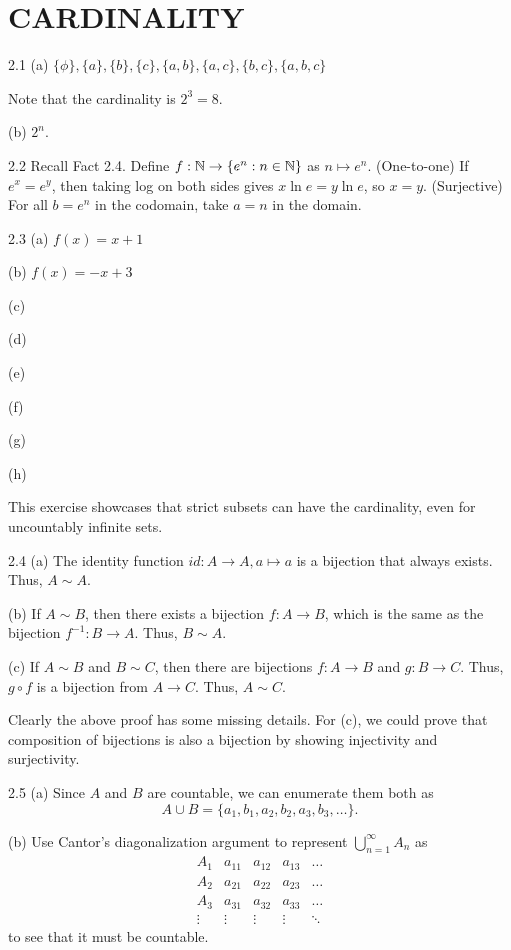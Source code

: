 \section{CARDINALITY}
2.1 (a) $\{\phi\},\{a\},\{b\}, \{c\},\{a,b\},\{a,c\}, \{b,c\}, \{a,b,c\}$
\begin{remark}
    Note that the cardinality is $2^3=8$.
\end{remark}

(b) $2^n$.

2.2 Recall Fact 2.4. Define $f:\mathbb{N} \rightarrow \{e^n: n \in \mathbb{N}\}$ as $n  \mapsto e^n$. (One-to-one) If $e^x=e^y$, then taking log on both sides
gives $x \ln e = y \ln e $, so $x=y$. (Surjective) For all $b = e^n$ in the codomain, take $a = n$ in the domain.   

2.3
(a) $f(x)=x+1$

(b) $f(x)=-x+3$

(c) 

(d)

(e) 

(f)

(g)

(h)
\begin{remark}
    This exercise showcases that strict subsets can have the cardinality, even for uncountably infinite sets.
\end{remark}

2.4 (a) The identity function $id:A \rightarrow A, a \mapsto a$ is a bijection that always exists. Thus, $A \sim A$.

(b) If $A \sim B$, then there exists a bijection $f:A \rightarrow B$, which is the same as the bijection $f^{-1}:B \rightarrow A$. Thus, $B \sim A$.

(c) If $A \sim B$ and $B \sim C$, then there are bijections $f:A \rightarrow B$ and $g:B \rightarrow C$. Thus, $g \circ f$ is a bijection from $A \rightarrow C$. Thus, $A \sim C$.

\begin{remark}
    Clearly the above proof has some missing details. For (c), we could prove that composition of bijections is also a bijection by showing
    injectivity and surjectivity.
\end{remark}

2.5 (a) Since $A$ and $B$ are countable, we can enumerate them both as \[A \cup B =\{a_1, b_1, a_2, b_2, a_3, b_3, \dots \}.\]

(b) Use Cantor's diagonalization argument to represent $\bigcup_{n=1}^{\infty} A_n$ as
\[\begin{matrix}
    A_{1} & a_{11} & a_{12} & a_{13} &\dots \\
    A_{2} & a_{21} & a_{22} & a_{23} &\dots \\
    A_{3} & a_{31} & a_{32} & a_{33} &\dots \\
    \vdots & \vdots & \vdots & \vdots &\ddots
\end{matrix}\]
to see that it must be countable.

